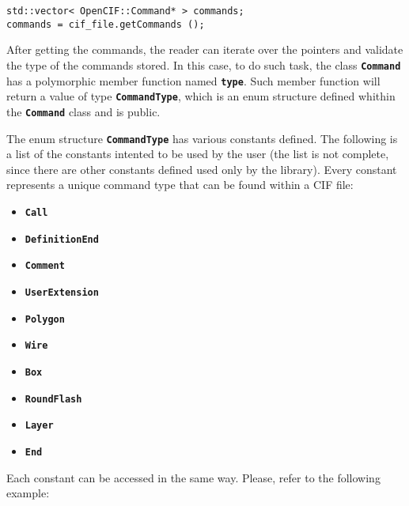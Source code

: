 \documentclass[11pt,twoside,openany,x11names,svgnames]{memoir}
\begin{document}
\begin{lstlisting}[frame=single,style=CPPStyle]
std::vector< OpenCIF::Command* > commands;
commands = cif_file.getCommands ();
\end{lstlisting}

After getting the commands, the reader can iterate over the pointers and validate the type of the commands stored. In this case, to do such task, the class \textbf{\texttt{Command}} has a polymorphic member function named \textbf{\texttt{type}}. Such member function will return a value of type \textbf{\texttt{CommandType}}, which is an enum structure defined whithin the \textbf{\texttt{Command}} class and is public.

The enum structure \textbf{\texttt{CommandType}} has various constants defined. The following is a list of the constants intented to be used by the user (the list is not complete, since there are other constants defined used only by the library). Every constant represents a unique command type that can be found within a CIF file:

\begin{itemize}
	\item \textbf{\texttt{Call}}
	\item \textbf{\texttt{DefinitionEnd}}
	\item \textbf{\texttt{Comment}}
	\item \textbf{\texttt{UserExtension}}
	\item \textbf{\texttt{Polygon}}
	\item \textbf{\texttt{Wire}}
	\item \textbf{\texttt{Box}}
	\item \textbf{\texttt{RoundFlash}}
	\item \textbf{\texttt{Layer}}
	\item \textbf{\texttt{End}}
\end{itemize}

Each constant can be accessed in the same way. Please, refer to the following example:
\end{document}
